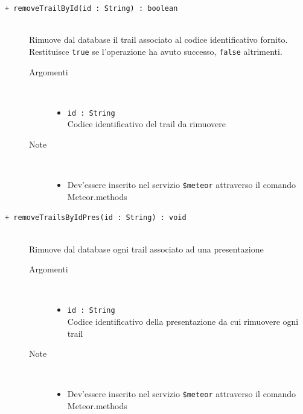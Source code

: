 \begin{description}
	\begin{description}
		\item[\texttt{+ removeTrailById(id : String) : boolean			}] \hfill \\
			Rimuove dal database il trail associato al codice identificativo fornito. Restituisce \texttt{true} se l'operazione ha avuto successo, \texttt{false} altrimenti.
			
		\begin{description}
			\item[Argomenti] \hfill \\
				\begin{itemize}
				
					\item \texttt{id : String		} \hfill \\
					Codice identificativo del trail da rimuovere
					
				\end{itemize}
			\item[Note] \hfill \\
			\begin{itemize}
					\item Dev'essere inserito nel servizio \texttt{\$meteor} attraverso il comando Meteor.methods
				\end{itemize}
		\end{description}
	\end{description}
	
	\begin{description}
		\item[\texttt{+ removeTrailsByIdPres(id : String) : void			}] \hfill \\
			Rimuove dal database ogni trail associato ad una presentazione
			
		\begin{description}
			\item[Argomenti] \hfill \\
				\begin{itemize}
				
					\item \texttt{id :  String		} \hfill \\
					Codice identificativo della presentazione da cui rimuovere ogni trail
					
				\end{itemize}
			\item[Note] \hfill \\
			\begin{itemize}
					\item Dev'essere inserito nel servizio \texttt{\$meteor} attraverso il comando Meteor.methods
				\end{itemize}
		\end{description}
	\end{description}
	

\end{description}
